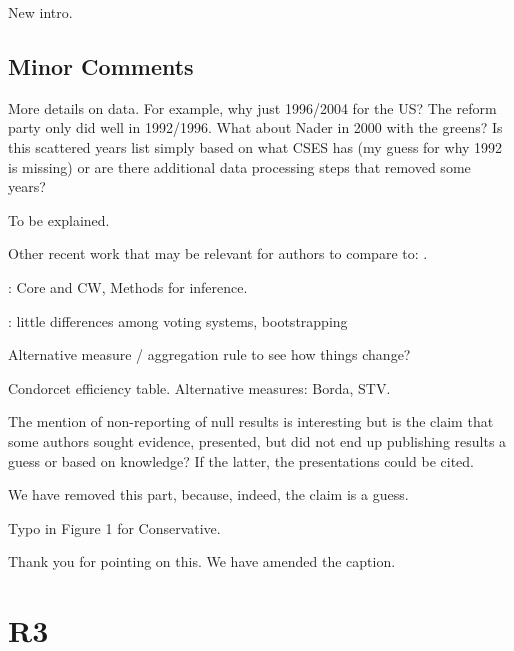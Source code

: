 \documentclass[a4paper, 12pt]{scrartcl}
\theoremstyle{break}
\newenvironment{changes}{\par\color{violet}\par\addvspace{\baselineskip}}{\par\addvspace{\baselineskip}}
\begin{document}
New intro.

\subsection{Minor Comments}
\begin{changes}
	More details on data. For example, why just 1996/2004 for the US? The reform party only did well in 1992/1996. What about Nader in 2000 with the greens? Is this scattered years list simply based on what CSES has (my guess for why 1992 is missing) or are there additional data processing steps that removed some years?
\end{changes}

To be explained.

\begin{changes}
	Other recent work that may be relevant for authors to compare to: \cite{Desai2025, Darmann2019}.
\end{changes}

\citeauthor{Desai2025}: Core and CW, Methods for inference.

\citeauthor{Darmann2019}: little differences among voting systems, bootstrapping


\begin{changes}
Alternative measure / aggregation rule to see how things change?
\end{changes}

Condorcet efficiency table. Alternative measures: Borda, STV. 

\begin{changes}
	The mention of non-reporting of null results is interesting but is the claim that some authors sought evidence, presented, but did not end up publishing results a guess or based on knowledge? If the latter, the presentations could be cited.
\end{changes}

We have removed this part, because, indeed, the claim is a guess.

\begin{changes}
	Typo in Figure 1 for Conservative.
\end{changes}
Thank you for pointing on this. We have amended the caption. 

\newpage
\section{R3}
\end{document}
